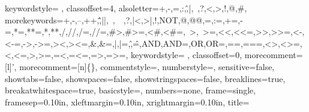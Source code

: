 {  keywordstyle={\color{spin_ctrl} \bf},  
  classoffset=4,
  alsoletter={+,-,=,:,\^,|,~,?,<,>,!,@,\#},
  morekeywords={+,-,--,++,\^\^,||,~,~~,?,|<,>|,!,NOT,@,@@,=,:=,+=,-=,*=,**=,*,**,/,//,/=,//=,\#>,\#>=,<\#,<\#=,~>,~>=,<<,<<=,>>,>>=,<-,<-=,->,->=,><,><=,\&,\&=,|,|=,\^,\^=,AND,AND=,OR,OR=,==,===,<>,<>=,<,<=,>,>=,=<,=<=,=>,=>=},
  keywordstyle={\color{spin_operator} \bf},  
  classoffset=0,
  morecomment=[l]{'},
  morecomment=[n]{\{}{\}},
  commentstyle=\color{spin_comment},
  numberstyle=\color{spin_num},
  sensitive=false,
  showtabs=false,
  showspaces=false,
  showstringspaces=false,
  breaklines=true,
  breakatwhitespace=true,
  basicstyle=\footnotesize\ttfamily,
  numbers=none,
  frame=single,
  framesep=0.10in,
  xleftmargin=0.10in,
  xrightmargin=0.10in,
  title=\lstname
}







